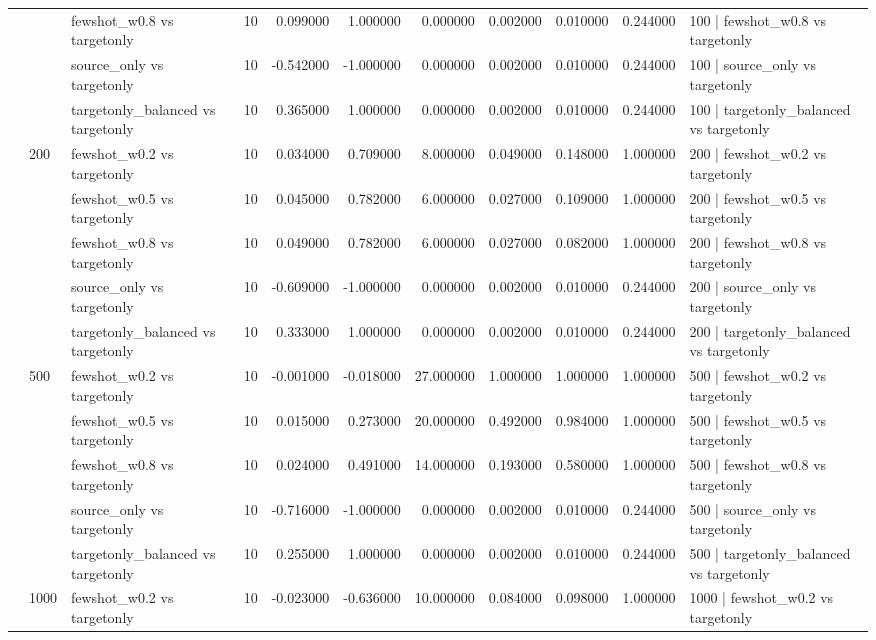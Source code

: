 \begin{tabular}{lllrrrrrrrl}
 &  & fewshot_w0.8 vs targetonly & 10 & 0.099000 & 1.000000 & 0.000000 & 0.002000 & 0.010000 & 0.244000 & 100 | fewshot_w0.8 vs targetonly \\
 &  & source_only vs targetonly & 10 & -0.542000 & -1.000000 & 0.000000 & 0.002000 & 0.010000 & 0.244000 & 100 | source_only vs targetonly \\
 &  & targetonly_balanced vs targetonly & 10 & 0.365000 & 1.000000 & 0.000000 & 0.002000 & 0.010000 & 0.244000 & 100 | targetonly_balanced vs targetonly \\
\cline{2-11}
 & \multirow[t]{5}{*}{200} & fewshot_w0.2 vs targetonly & 10 & 0.034000 & 0.709000 & 8.000000 & 0.049000 & 0.148000 & 1.000000 & 200 | fewshot_w0.2 vs targetonly \\
 &  & fewshot_w0.5 vs targetonly & 10 & 0.045000 & 0.782000 & 6.000000 & 0.027000 & 0.109000 & 1.000000 & 200 | fewshot_w0.5 vs targetonly \\
 &  & fewshot_w0.8 vs targetonly & 10 & 0.049000 & 0.782000 & 6.000000 & 0.027000 & 0.082000 & 1.000000 & 200 | fewshot_w0.8 vs targetonly \\
 &  & source_only vs targetonly & 10 & -0.609000 & -1.000000 & 0.000000 & 0.002000 & 0.010000 & 0.244000 & 200 | source_only vs targetonly \\
 &  & targetonly_balanced vs targetonly & 10 & 0.333000 & 1.000000 & 0.000000 & 0.002000 & 0.010000 & 0.244000 & 200 | targetonly_balanced vs targetonly \\
\cline{2-11}
 & \multirow[t]{5}{*}{500} & fewshot_w0.2 vs targetonly & 10 & -0.001000 & -0.018000 & 27.000000 & 1.000000 & 1.000000 & 1.000000 & 500 | fewshot_w0.2 vs targetonly \\
 &  & fewshot_w0.5 vs targetonly & 10 & 0.015000 & 0.273000 & 20.000000 & 0.492000 & 0.984000 & 1.000000 & 500 | fewshot_w0.5 vs targetonly \\
 &  & fewshot_w0.8 vs targetonly & 10 & 0.024000 & 0.491000 & 14.000000 & 0.193000 & 0.580000 & 1.000000 & 500 | fewshot_w0.8 vs targetonly \\
 &  & source_only vs targetonly & 10 & -0.716000 & -1.000000 & 0.000000 & 0.002000 & 0.010000 & 0.244000 & 500 | source_only vs targetonly \\
 &  & targetonly_balanced vs targetonly & 10 & 0.255000 & 1.000000 & 0.000000 & 0.002000 & 0.010000 & 0.244000 & 500 | targetonly_balanced vs targetonly \\
\cline{2-11}
 & \multirow[t]{5}{*}{1000} & fewshot_w0.2 vs targetonly & 10 & -0.023000 & -0.636000 & 10.000000 & 0.084000 & 0.098000 & 1.000000 & 1000 | fewshot_w0.2 vs targetonly \\

\end{tabular}
